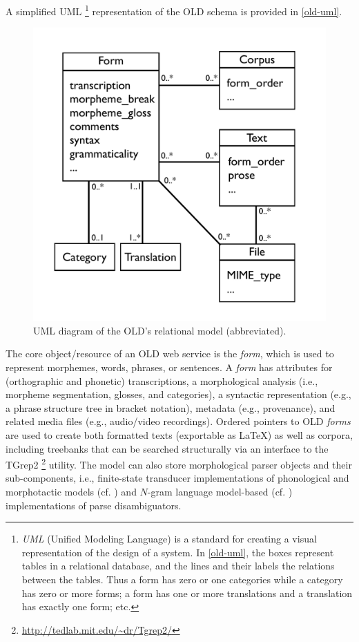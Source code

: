 \documentclass[11pt]{article}
\begin{document}
A simplified UML%
\footnote{\textit{UML} (Unified Modeling Language) is a standard for creating
    a visual representation of the design of a system. In \autoref{old-uml}, the
    boxes represent tables in a relational database, and the lines and their
    labels the relations between the tables. Thus a form has zero or one
    categories while a category has zero or more forms; a form has one or more
translations and a translation has exactly one form; etc.} %
representation of the OLD schema is provided in
\autoref{old-uml}. 

\begin{figure}[h]
\begin{center}
\includegraphics[scale=0.35]{images/OLD_relational_model_UML.pdf}
\caption{UML diagram of the OLD's relational model (abbreviated).}
\label{old-uml}
\end{center}
\end{figure}

The core object/resource of an OLD web service is the \textit{form}, which is
used to represent morphemes, words, phrases, or sentences. A \emph{form} has
attributes for (orthographic and phonetic) transcriptions, a morphological
analysis (i.e., morpheme segmentation, glosses, and categories), a syntactic
representation (e.g., a phrase structure tree in bracket notation), metadata
(e.g., provenance), and related media files (e.g., audio/video recordings).
Ordered pointers to OLD \emph{forms} are used to create both formatted texts
(exportable as LaTeX) as well as corpora, including treebanks that can be
searched structurally via an interface to the TGrep2%
\footnote{\url{http://tedlab.mit.edu/~dr/Tgrep2/}} %
utility. The model can also store morphological parser objects and their
sub-components, i.e., finite-state transducer implementations of phonological
and morphotactic models (cf. \cite{beesley2003finite}) and $N$-gram language
model-based (cf.  \cite{manning1999foundations}) implementations of parse
disambiguators.
\end{document}
